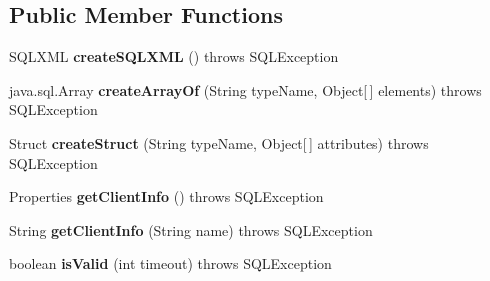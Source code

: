 \subsection*{Public Member Functions}
\begin{DoxyCompactItemize}
\item 
\mbox{\label{interfacecom_1_1mysql_1_1jdbc_1_1_j_d_b_c4_my_s_q_l_connection_aadc9972f5805dda626e5dfdefd9145c1}} 
S\+Q\+L\+X\+ML {\bfseries create\+S\+Q\+L\+X\+ML} ()  throws S\+Q\+L\+Exception
\item 
\mbox{\label{interfacecom_1_1mysql_1_1jdbc_1_1_j_d_b_c4_my_s_q_l_connection_ad8b9b19f5a9b2359097c065d225188d9}} 
java.\+sql.\+Array {\bfseries create\+Array\+Of} (String type\+Name, Object\mbox{[}$\,$\mbox{]} elements)  throws S\+Q\+L\+Exception
\item 
\mbox{\label{interfacecom_1_1mysql_1_1jdbc_1_1_j_d_b_c4_my_s_q_l_connection_a54f6ff6d95ea6aaebe5d35928fa5145e}} 
Struct {\bfseries create\+Struct} (String type\+Name, Object\mbox{[}$\,$\mbox{]} attributes)  throws S\+Q\+L\+Exception
\item 
\mbox{\label{interfacecom_1_1mysql_1_1jdbc_1_1_j_d_b_c4_my_s_q_l_connection_a1ed56fbcadc2276906b5571a96ecfe0a}} 
Properties {\bfseries get\+Client\+Info} ()  throws S\+Q\+L\+Exception
\item 
\mbox{\label{interfacecom_1_1mysql_1_1jdbc_1_1_j_d_b_c4_my_s_q_l_connection_ac67503d35760e77704c32842582fcd3c}} 
String {\bfseries get\+Client\+Info} (String name)  throws S\+Q\+L\+Exception
\item 
\mbox{\label{interfacecom_1_1mysql_1_1jdbc_1_1_j_d_b_c4_my_s_q_l_connection_a024a2b8e19fef7bb34d6766df967cd43}} 
boolean {\bfseries is\+Valid} (int timeout)  throws S\+Q\+L\+Exception
\item 
\mbox{\label{interfacecom_1_1mysql_1_1jdbc_1_1_j_d_b_c4_my_s_q_l_connection_aba7fd7950c5f6d87e7924af06c6dd8df}} 

\end{DoxyCompactItemize}
